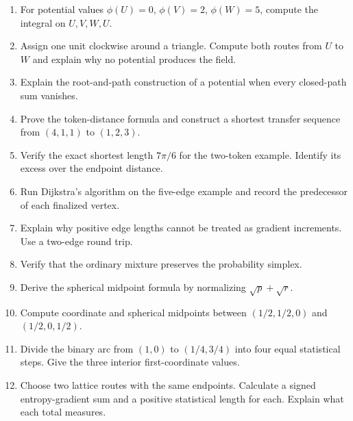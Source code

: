 \documentclass[11pt,oneside,openany]{book}
\theoremstyle{definition}
\theoremstyle{remark}
\newenvironment{exercises}{\begin{enumerate}[label=\thechapter.\arabic*,ref=\thechapter.\arabic*,leftmargin=2.8em,itemsep=6pt]}{\end{enumerate}}
\numberwithin{equation}{chapter}
\begin{document}
\begin{exercises}

\item 

For potential values \(\phi(U)=0\), \(\phi(V)=2\), \(\phi(W)=5\), compute the integral on \(U,V,W,U\).

\item 

Assign one unit clockwise around a triangle. Compute both routes from \(U\) to \(W\) and explain why no potential produces the field.

\item 

Explain the root-and-path construction of a potential when every closed-path sum vanishes.

\item 

Prove the token-distance formula and construct a shortest transfer sequence from \((4,1,1)\) to \((1,2,3)\).

\item 

Verify the exact shortest length \(7\pi/6\) for the two-token example. Identify its excess over the endpoint distance.

\item 

Run Dijkstra's algorithm on the five-edge example and record the predecessor of each finalized vertex.

\item 

Explain why positive edge lengths cannot be treated as gradient increments. Use a two-edge round trip.

\item 

Verify that the ordinary mixture preserves the probability simplex.

\item 

Derive the spherical midpoint formula by normalizing \(\sqrt p+\sqrt r\).

\item 

Compute coordinate and spherical midpoints between \((1/2,1/2,0)\) and \((1/2,0,1/2)\).

\item 

Divide the binary arc from \((1,0)\) to \((1/4,3/4)\) into four equal statistical steps. Give the three interior first-coordinate values.

\item 

Choose two lattice routes with the same endpoints. Calculate a signed entropy-gradient sum and a positive statistical length for each. Explain what each total measures.

\end{exercises}
\end{document}
